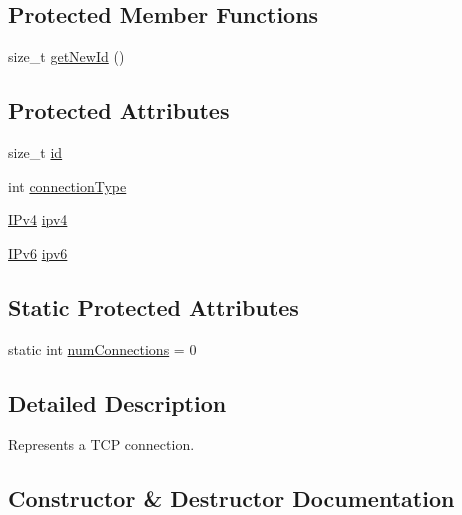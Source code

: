 \subsection*{Protected Member Functions}
\begin{DoxyCompactItemize}
\item 
size\+\_\+t \mbox{\hyperlink{class_rad_j_a_v_1_1_networking_1_1_t_c_p_connection_aee86e1f0878e49882dee5bb9d7909607}{get\+New\+Id}} ()
\end{DoxyCompactItemize}
\subsection*{Protected Attributes}
\begin{DoxyCompactItemize}
\item 
size\+\_\+t \mbox{\hyperlink{class_rad_j_a_v_1_1_networking_1_1_t_c_p_connection_a4ca69a3642a07cb137c48acb989b0757}{id}}
\item 
int \mbox{\hyperlink{class_rad_j_a_v_1_1_networking_1_1_t_c_p_connection_ae24db0c9dac2a7ae3c41afd17ff65d80}{connection\+Type}}
\item 
\mbox{\hyperlink{class_rad_j_a_v_1_1_networking_1_1_i_pv4}{I\+Pv4}} \mbox{\hyperlink{class_rad_j_a_v_1_1_networking_1_1_t_c_p_connection_a2dc53527dc30118419d87d2934d032ae}{ipv4}}
\item 
\mbox{\hyperlink{class_rad_j_a_v_1_1_networking_1_1_i_pv6}{I\+Pv6}} \mbox{\hyperlink{class_rad_j_a_v_1_1_networking_1_1_t_c_p_connection_a3ddda74035ec41a86c9431c084cd0097}{ipv6}}
\end{DoxyCompactItemize}
\subsection*{Static Protected Attributes}
\begin{DoxyCompactItemize}
\item 
static int \mbox{\hyperlink{class_rad_j_a_v_1_1_networking_1_1_t_c_p_connection_a342f7c52a3e4c2567b8263f68109ffcb}{num\+Connections}} = 0
\end{DoxyCompactItemize}


\subsection{Detailed Description}
Represents a T\+CP connection. 

\subsection{Constructor \& Destructor Documentation}
\mbox{\label{class_rad_j_a_v_1_1_networking_1_1_t_c_p_connection_a0fab77382e716af1b1c425f9d5102fc2}} 
